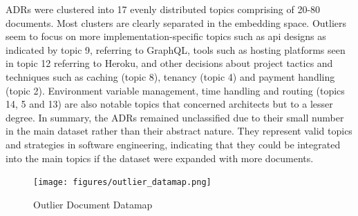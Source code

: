         ADRs were clustered into 17 evenly distributed topics comprising of 20-80 documents. Most clusters are clearly separated in the embedding space. Outliers seem to focus on more implementation-specific topics such as api designs as indicated by topic 9, referring to GraphQL, tools such as hosting platforms seen in topic 12 referring to Heroku, and other decisions about project tactics and techniques such as caching (topic 8), tenancy (topic 4) and payment handling (topic 2). Environment variable management, time handling and routing (topics 14, 5 and 13) are also notable topics that concerned architects but to a lesser degree. In summary, the ADRs remained unclassified due to their small number in the main dataset rather than their abstract nature. They represent valid topics and strategies in software engineering, indicating that they could be integrated into the main topics if the dataset were expanded with more documents.
        
        \begin{figure}[H]
            \centering
            \hspace*{-1.2cm} 
            \texttt{[image: figures/outlier\_datamap.png]}
            \caption{Outlier Document Datamap}
            \label{fig:outlier_datamap}
        \end{figure}

    \newpage
